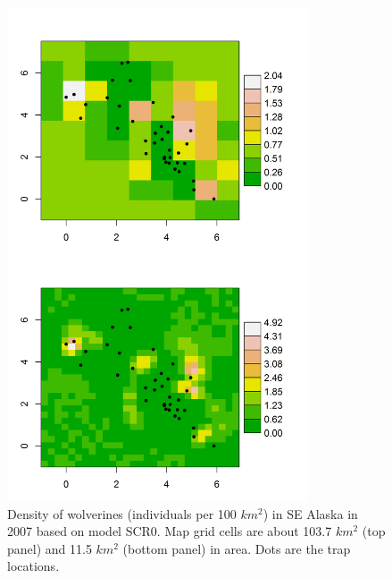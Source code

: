 {{\begin{figure}
\begin{center}
\includegraphics[height=5.75in,width=3.5in]{Ch4-SCR0/figs/wolvDensity}
\end{center}
\caption{Density of wolverines (individuals per 100 $km^2$) in SE Alaska in 2007 based on
  model SCR0. Map grid cells are about 103.7 $km^2$ (top panel) and 
11.5 $km^2$ (bottom panel) in area. Dots are the trap locations.}
\label{scr0.fig.density}
\end{figure}



}}
